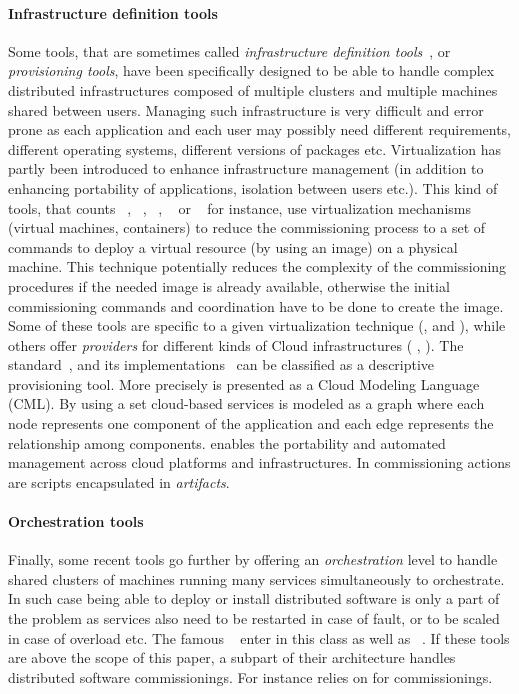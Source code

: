 \paragraph{Infrastructure definition tools}
Some tools, that are sometimes called \emph{infrastructure definition
  tools}~\cite{}, or \emph{provisioning tools}, have been specifically
designed to be able to handle complex distributed infrastructures
composed of multiple clusters and multiple machines shared between
users. Managing such infrastructure is very difficult and error prone
as each application and each user may possibly need different
requirements, different operating systems, different versions of
packages etc. Virtualization has partly been introduced to enhance
infrastructure management (in addition to enhancing portability of
applications, isolation between users etc.). This kind of tools, that
counts \docker~\cite{}, \terraform~\cite{}, \juju~\cite{},
\cloudformation~\cite{} or \heat~\cite{} for instance, use
virtualization mechanisms (\eg virtual machines, containers) to reduce
the commissioning process to a set of commands to deploy a virtual
resource (by using an image) on a physical machine. This technique
potentially reduces the complexity of the commissioning procedures if
the needed image is already available, otherwise the initial
commissioning commands and coordination have to be done to create the
image. Some of these tools are specific to a given virtualization
technique (\eg \docker, \cloudformation and \heat), while others offer
\emph{providers} for different kinds of Cloud infrastructures (\eg
\terraform, \juju). The \tosca standard~\cite{}, and its
implementations~\cite{} can be classified as a descriptive
provisioning tool. More precisely \tosca is presented as a Cloud
Modeling Language (CML). By using \tosca a set cloud-based services
is modeled as a graph where each node represents one component of the
application and each edge represents the relationship among
components. \tosca enables the portability and automated management
across cloud platforms and infrastructures. In \tosca commissioning
actions are scripts encapsulated in \emph{artifacts}.

\paragraph{Orchestration tools}
Finally, some recent tools go further by offering an
\emph{orchestration} level to handle shared clusters of machines
running many services simultaneously to orchestrate. In such case
being able to deploy or install distributed software is only a part of
the problem as services also need to be restarted in case of fault, or
to be scaled in case of overload etc. The famous \kubernetes~\cite{}
enter in this class as well as \dockerswarm~\cite{}. If these tools
are above the scope of this paper, a subpart of their architecture
handles distributed software commissionings. For instance \kubernetes
relies on \docker for commissionings.

